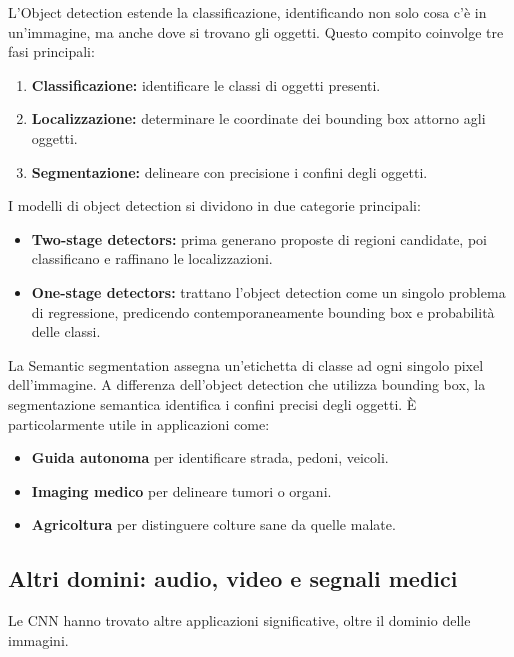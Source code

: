 \documentclass[a4paper,12pt]{report}
\begin{document}
	L'Object detection estende la classificazione, identificando non solo cosa c'è in un'immagine, ma anche dove si trovano gli oggetti. Questo compito coinvolge tre fasi principali:
	\begin{enumerate}
		\item \textbf{Classificazione:} identificare le classi di oggetti presenti.
		\item \textbf{Localizzazione:} determinare le coordinate dei bounding box attorno agli oggetti.
		\item \textbf{Segmentazione:} delineare con precisione i confini degli oggetti.
	\end{enumerate}
	
	I modelli di object detection si dividono in due categorie principali:
	\begin{itemize}
		\item \textbf{Two-stage detectors:} prima generano proposte di regioni candidate, poi classificano e raffinano le localizzazioni.
		\item \textbf{One-stage detectors:} trattano l'object detection come un singolo problema di regressione, predicendo contemporaneamente bounding box e probabilità delle classi.
	\end{itemize}
	
	La Semantic segmentation assegna un'etichetta di classe ad ogni singolo pixel dell'immagine. A differenza dell'object detection che utilizza bounding box, la segmentazione semantica identifica i confini precisi degli oggetti. È particolarmente utile in applicazioni come:
	\begin{itemize}
		\item \textbf{Guida autonoma} per identificare strada, pedoni, veicoli.
		\item \textbf{Imaging medico} per delineare tumori o organi.
		\item \textbf{Agricoltura} per distinguere colture sane da quelle malate.
	\end{itemize}
	
	\subsection{Altri domini: audio, video e segnali medici}
	Le CNN hanno trovato altre applicazioni significative, oltre il dominio delle immagini.
	
\end{document}
